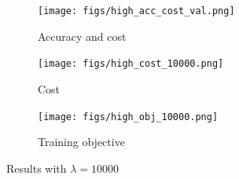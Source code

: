 \begin{figure}
    \centering
    \begin{subfigure}[b]{0.47\textwidth}
        \centering
        \texttt{[image: figs/high\_acc\_cost\_val.png]}
        \caption{Accuracy and cost}
        \label{fig:high_cost_acc}
    \end{subfigure}
    \hfill
    \begin{subfigure}[b]{0.47\textwidth}
        \centering
        \texttt{[image: figs/high\_cost\_10000.png]}
        \caption{Cost}
        \label{fig:high_cost}
    \end{subfigure}
    \hfill
    \begin{subfigure}[b]{0.47\textwidth}
        \centering
        \texttt{[image: figs/high\_obj\_10000.png]}
        \caption{Training objective}
        \label{fig:high_obj}
    \end{subfigure}
    \caption{Results with $\lambda = 10000$}
    \label{fig:high}
\end{figure}
